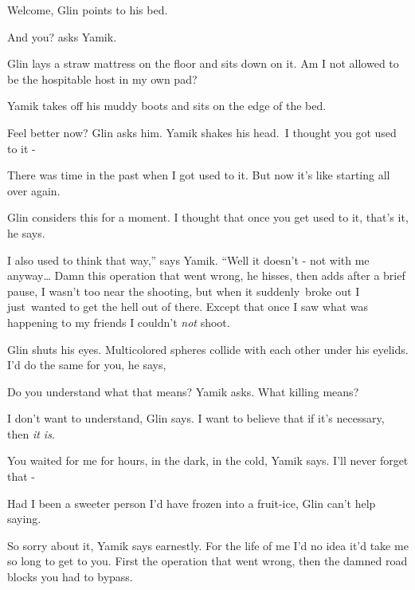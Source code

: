 \documentclass[letterpaper]{article}
\begin{document}
{\textquotedbl}Welcome,{\textquotedbl} Glin points to his bed. 

{\textquotedbl}And you?{\textquotedbl} asks Yamik.~ 

Glin lays a straw mattress on the floor and sits down on it. {\textquotedbl}Am I not allowed to be the hospitable host
in my own pad?{\textquotedbl}

Yamik takes off his muddy boots and sits on the edge of the bed. 

{\textquotedbl}Feel better now?{\textquotedbl} Glin asks him. Yamik shakes his
head.\textcolor[rgb]{0.0,0.4392157,0.7529412}{\ }{\textquotedbl}I thought you got used to it -{\textquotedbl} 

{\textquotedbl}There was time in the past when I got used to it. But now it's like starting all over
again.{\textquotedbl} 

Glin considers this for a moment. {\textquotedbl}I thought that once you get used to it, that's it,{\textquotedbl} he
says.

{\textquotedbl}I also used to think that way,'' says Yamik. ``Well it doesn't - not with me anyway{\dots} Damn this
operation that went wrong,{\textquotedbl} he hisses, then adds after a brief pause,{\textquotedbl} I wasn't too near
the shooting, but when it suddenly\textcolor[rgb]{0.0,0.4392157,0.7529412}{\ }broke out I
just\textcolor[rgb]{0.0,0.4392157,0.7529412}{\ }wanted to get the hell out of there. Except that once I saw what was
happening to my friends I couldn't \textit{not} shoot.{\textquotedbl} 

Glin shuts his eyes. Multicolored spheres collide with each other under his eyelids. {\textquotedbl}I'd do the same for
you,{\textquotedbl} he says,

{\textquotedbl}Do you understand what that means?{\textquotedbl} Yamik asks. {\textquotedbl}What killing
means?{\textquotedbl} 

{\textquotedbl}I don't want to understand,{\textquotedbl} Glin says. {\textquotedbl}I want to believe that if it's
necessary, then \textit{it is}.{\textquotedbl}

{\textquotedbl}You waited for me for hours, in the dark, in the cold,{\textquotedbl} Yamik says. {\textquotedbl}I'll
never forget that -{\textquotedbl} 

{\textquotedbl}Had I been a sweeter person I'd have frozen into a fruit-ice,{\textquotedbl} Glin can't help saying.

{\textquotedbl}So sorry about it,{\textquotedbl} Yamik says earnestly. {\textquotedbl}For the life of me I'd no idea
it'd take me so long to get to you. First the operation that went wrong, then the damned road blocks you had to
bypass.{\textquotedbl}
\end{document}
